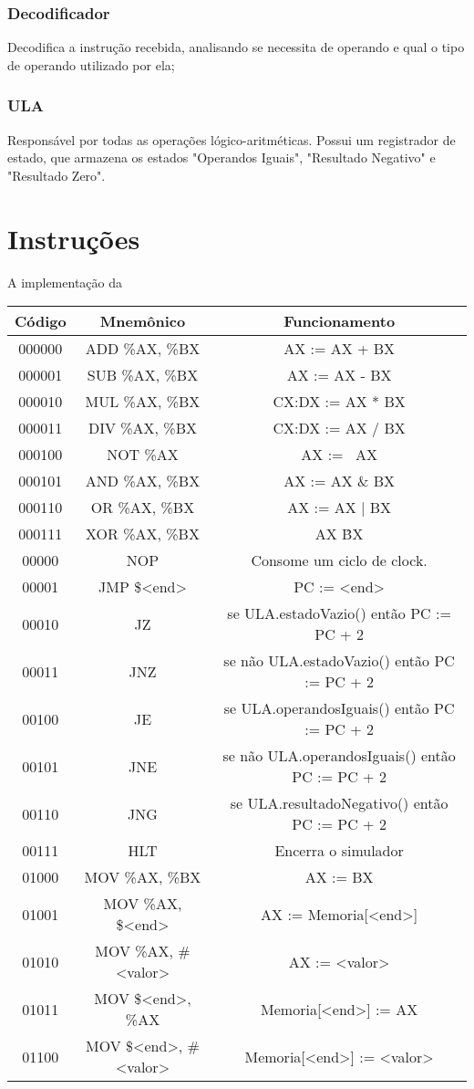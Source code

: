 \documentclass[
	12pt,				%
	oneside,			%
	a4paper,			%
	english,			%
	french,				%
	spanish,			%
	brazil,				%
	]{abntex2}
\begin{document}
{		\subsubsection{Decodificador}
		Decodifica a instrução recebida, analisando se necessita de operando e
		qual o tipo de operando utilizado por ela;
		\subsubsection{ULA}
		Responsável por todas as operações lógico-aritméticas. Possui um
		registrador de estado, que armazena os estados "Operandos Iguais",
		"Resultado Negativo" e "Resultado Zero".


\section{Instruções}
A implementação da

\begin{tabular}{|c|c|c|}
\hline
Código & Mnemônico & Funcionamento \\
\hline
000000 & ADD \%AX, \%BX & AX := AX + BX \\
\hline
000001 & SUB \%AX, \%BX & AX := AX - BX \\
\hline
000010 & MUL \%AX, \%BX & CX:DX := AX * BX\\
\hline
000011 & DIV \%AX, \%BX & CX:DX := AX / BX \\
\hline
000100 & NOT \%AX &  AX := ~AX \\
\hline
000101 & AND \%AX, \%BX & AX := AX \& BX\\
\hline
000110 & OR \%AX, \%BX & AX := AX | BX \\
\hline
000111 & XOR \%AX, \%BX & AX \^ BX \\
\hline
00000 & NOP & Consome um ciclo de clock. \\
\hline
00001 & JMP \$<end> & PC := <end> \\
\hline
00010 & JZ & se ULA.estadoVazio() então PC := PC + 2 \\
\hline
00011 & JNZ & se não ULA.estadoVazio() então PC := PC + 2 \\
\hline
00100 & JE & se ULA.operandosIguais() então PC := PC + 2 \\
\hline
00101 & JNE & se não ULA.operandosIguais() então PC := PC + 2 \\
\hline
00110 & JNG & se ULA.resultadoNegativo() então PC := PC + 2 \\
\hline
00111 & HLT & Encerra o simulador \\
\hline
01000 & MOV \%AX, \%BX & AX := BX \\
\hline
01001 & MOV \%AX, \$<end> & AX := Memoria[<end>] \\
\hline
01010 & MOV \%AX, \#<valor> & AX := <valor> \\
\hline
01011 & MOV \$<end>, \%AX & Memoria[<end>] := AX \\
\hline
01100 & MOV \$<end>, \#<valor> & Memoria[<end>] := <valor> \\
\hline
\end{tabular}

}
\end{document}
